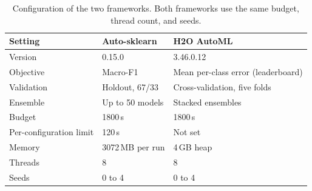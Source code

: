 \begin{table}[t]
\centering
\caption{Configuration of the two frameworks. Both frameworks use the same budget, thread count, and seeds.}
\label{tab:config}
\scriptsize
\setlength{\tabcolsep}{3pt}
\begin{tabular}{@{}p{0.85in}p{1.2in}p{1.25in}@{}}
\toprule
Setting & Auto-sklearn & H2O AutoML \\
\midrule
Version & 0.15.0 & 3.46.0.12 \\
Objective & Macro-F1 & Mean per-class error (leaderboard) \\
Validation & Holdout, 67/33 & Cross-validation, five folds \\
Ensemble & Up to 50 models & Stacked ensembles \\
Budget & 1800\,s & 1800\,s \\
Per-configuration limit & 120\,s & Not set \\
Memory & 3072\,MB per run & 4\,GB heap \\
Threads & 8 & 8 \\
Seeds & 0 to 4 & 0 to 4 \\
\bottomrule
\end{tabular}
\end{table}
